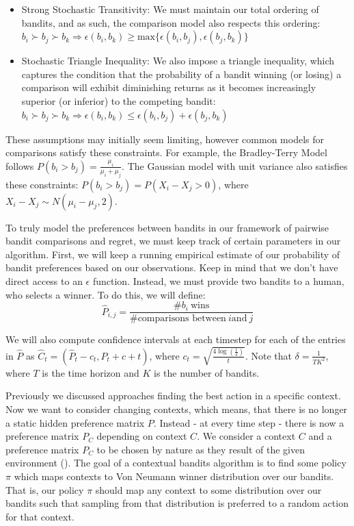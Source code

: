 \documentclass[
  letterpaper,
  numbers=noenddot,
  DIV=11,
  oneside]{scrreprt}
\theoremstyle{remark}
\begin{document}
\begin{itemize}
\item
  Strong Stochastic Transitivity: We must maintain our total ordering of
  bandits, and as such, the comparison model also respects this
  ordering:
  \(b_i \succ b_j \succ b_k \Rightarrow \epsilon(b_i, b_k) \ge \text{max}\{\epsilon(b_i, b_j), \epsilon(b_j, b_k)\}\)
\item
  Stochastic Triangle Inequality: We also impose a triangle inequality,
  which captures the condition that the probability of a bandit winning
  (or losing) a comparison will exhibit diminishing returns as it
  becomes increasingly superior (or inferior) to the competing bandit:
  \(b_i \succ b_j \succ b_k \Rightarrow \epsilon(b_i, b_k) \le \epsilon(b_i, b_j) + \epsilon(b_j, b_k)\)
\end{itemize}

These assumptions may initially seem limiting, however common models for
comparisons satisfy these constraints. For example, the Bradley-Terry
Model follows \(P(b_i > b_j) = \frac{\mu_i}{\mu_i + \mu_j}\). The
Gaussian model with unit variance also satisfies these constraints:
\(P(b_i > b_j) = P(X_i - X_j > 0)\), where
\(X_i - X_j \sim N(\mu_i - \mu_j, 2)\).

To truly model the preferences between bandits in our framework of
pairwise bandit comparisons and regret, we must keep track of certain
parameters in our algorithm. First, we will keep a running empirical
estimate of our probability of bandit preferences based on our
observations. Keep in mind that we don't have direct access to an
\(\epsilon\) function. Instead, we must provide two bandits to a human,
who selects a winner. To do this, we will define:
\[\hat{P}_{i, j} = \frac{\# b_i\ \text{wins}}{\# \text{comparisons between}\ i \text{and}\ j}\]

We will also compute confidence intervals at each timestep for each of
the entries in \(\hat{P}\) as
\(\hat{C}_t = \left( \hat{P}_t - c_t, \hat{P}_t + c+t \right)\), where
\(c_t = \sqrt{\frac{4\log(\frac{1}{\delta})}{t}}\). Note that
\(\delta = \frac{1}{TK^2}\), where \(T\) is the time horizon and \(K\)
is the number of bandits.

Previously we discussed approaches finding the best action in a specific
context. Now we want to consider changing contexts, which means, that
there is no longer a static hidden preference matrix \(P\). Instead - at
every time step - there is now a preference matrix \(P_C\) depending on
context \(C\). We consider a context \(C\) and a preference matrix
\(P_C\) to be chosen by nature as they result of the given environment
(). The goal of a
contextual bandits algorithm is to find some policy \(\pi\) which maps
contexts to Von Neumann winner distribution over our bandits. That is,
our policy \(\pi\) should map any context to some distribution over our
bandits such that sampling from that distribution is preferred to a
random action for that context.
\end{document}

